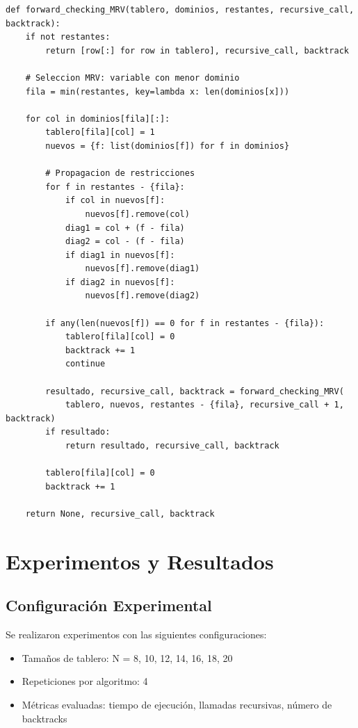\documentclass[12pt,a4paper]{article}
\begin{document}
\begin{lstlisting}[caption=Implementación de Forward Checking con MRV]
def forward_checking_MRV(tablero, dominios, restantes, recursive_call, backtrack):
    if not restantes:
        return [row[:] for row in tablero], recursive_call, backtrack

    # Seleccion MRV: variable con menor dominio
    fila = min(restantes, key=lambda x: len(dominios[x]))
        
    for col in dominios[fila][:]:
        tablero[fila][col] = 1
        nuevos = {f: list(dominios[f]) for f in dominios}
        
        # Propagacion de restricciones
        for f in restantes - {fila}:
            if col in nuevos[f]:
                nuevos[f].remove(col)
            diag1 = col + (f - fila)
            diag2 = col - (f - fila)
            if diag1 in nuevos[f]:
                nuevos[f].remove(diag1)
            if diag2 in nuevos[f]:
                nuevos[f].remove(diag2) 

        if any(len(nuevos[f]) == 0 for f in restantes - {fila}):
            tablero[fila][col] = 0
            backtrack += 1
            continue

        resultado, recursive_call, backtrack = forward_checking_MRV(
            tablero, nuevos, restantes - {fila}, recursive_call + 1, backtrack)
        if resultado: 
            return resultado, recursive_call, backtrack

        tablero[fila][col] = 0
        backtrack += 1

    return None, recursive_call, backtrack
\end{lstlisting}
\newpage
\section{Experimentos y Resultados}

\subsection{Configuración Experimental}

Se realizaron experimentos con las siguientes configuraciones:
\begin{itemize}
    \item Tamaños de tablero: N = 8, 10, 12, 14, 16, 18, 20
    \item Repeticiones por algoritmo: 4
    \item Métricas evaluadas: tiempo de ejecución, llamadas recursivas, número de backtracks
\end{itemize}
\end{document}
